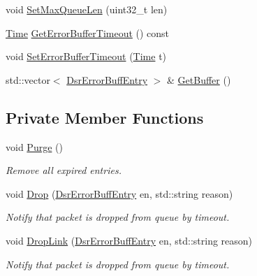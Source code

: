 \begin{DoxyCompactItemize}
\item 
void \hyperlink{classns3_1_1dsr_1_1DsrErrorBuffer_a33d6346a6ae17ae2c4deb4eb78e265d4}{Set\+Max\+Queue\+Len} (uint32\+\_\+t len)
\item 
\hyperlink{classns3_1_1Time}{Time} \hyperlink{classns3_1_1dsr_1_1DsrErrorBuffer_a5aa81c31d709ffaec8814130f2cae7c5}{Get\+Error\+Buffer\+Timeout} () const 
\item 
void \hyperlink{classns3_1_1dsr_1_1DsrErrorBuffer_a97b369b6d8af902f6249d9746e85f4e2}{Set\+Error\+Buffer\+Timeout} (\hyperlink{classns3_1_1Time}{Time} t)
\item 
std\+::vector$<$ \hyperlink{classns3_1_1dsr_1_1DsrErrorBuffEntry}{Dsr\+Error\+Buff\+Entry} $>$ \& \hyperlink{classns3_1_1dsr_1_1DsrErrorBuffer_a22d3ec2e414fcd61530b5895251f91b1}{Get\+Buffer} ()
\end{DoxyCompactItemize}
\subsection*{Private Member Functions}
\begin{DoxyCompactItemize}
\item 
void \hyperlink{classns3_1_1dsr_1_1DsrErrorBuffer_af17a503d0ee7256061f4b09b7518293e}{Purge} ()
\begin{DoxyCompactList}\small\item\em Remove all expired entries. \end{DoxyCompactList}\item 
void \hyperlink{classns3_1_1dsr_1_1DsrErrorBuffer_ae3d652471c13c24c6a333718c1b917a5}{Drop} (\hyperlink{classns3_1_1dsr_1_1DsrErrorBuffEntry}{Dsr\+Error\+Buff\+Entry} en, std\+::string reason)
\begin{DoxyCompactList}\small\item\em Notify that packet is dropped from queue by timeout. \end{DoxyCompactList}\item 
void \hyperlink{classns3_1_1dsr_1_1DsrErrorBuffer_a5407deb8e24589c4191714e190ff7497}{Drop\+Link} (\hyperlink{classns3_1_1dsr_1_1DsrErrorBuffEntry}{Dsr\+Error\+Buff\+Entry} en, std\+::string reason)
\begin{DoxyCompactList}\small\item\em Notify that packet is dropped from queue by timeout. \end{DoxyCompactList}\end{DoxyCompactItemize}
